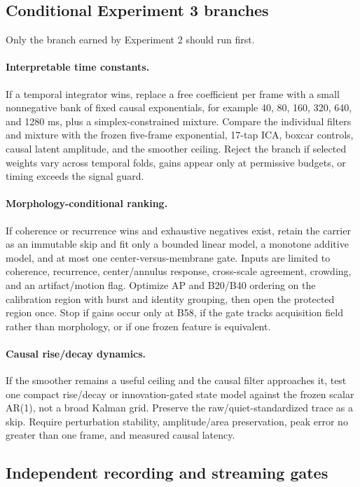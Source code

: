 \subsection{Conditional Experiment 3 branches}

Only the branch earned by Experiment 2 should run first.

\paragraph{Interpretable time constants.}
If a temporal integrator wins, replace a free coefficient per frame with a
small nonnegative bank of fixed causal exponentials, for example 40, 80, 160,
320, 640, and 1280 ms, plus a simplex-constrained mixture. Compare the
individual filters and mixture with the frozen five-frame exponential,
17-tap ICA, boxcar controls, causal latent amplitude, and the smoother ceiling.
Reject the branch if selected weights vary across temporal folds, gains appear
only at permissive budgets, or timing exceeds the signal guard.

\paragraph{Morphology-conditional ranking.}
If coherence or recurrence wins and exhaustive negatives exist, retain the
carrier as an immutable skip and fit only a bounded linear model, a monotone
additive model, and at most one center-versus-membrane gate. Inputs are limited
to coherence, recurrence, center/annulus response, cross-scale agreement,
crowding, and an artifact/motion flag. Optimize AP and B20/B40 ordering on the
calibration region with burst and identity grouping, then open the protected
region once. Stop if gains occur only at B58, if the gate tracks acquisition
field rather than morphology, or if one frozen feature is equivalent.

\paragraph{Causal rise/decay dynamics.}
If the smoother remains a useful ceiling and the causal filter approaches it,
test one compact rise/decay or innovation-gated state model against the frozen
scalar AR(1), not a broad Kalman grid. Preserve the raw/quiet-standardized trace
as a skip. Require perturbation stability, amplitude/area preservation, peak
error no greater than one frame, and measured causal latency.

\subsection{Independent recording and streaming gates}

